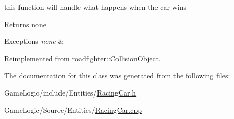 this function will handle what happens when the car wins \begin{DoxyReturn}{Returns}
none 
\end{DoxyReturn}

\begin{DoxyExceptions}{Exceptions}
{\em none} & \\
\hline
\end{DoxyExceptions}


Reimplemented from \hyperlink{classroadfighter_1_1CollisionObject_aa793e1b9943ee90bbb4129ddd06b9be7}{roadfighter\+::\+Collision\+Object}.



The documentation for this class was generated from the following files\+:\begin{DoxyCompactItemize}
\item 
Game\+Logic/include/\+Entities/\hyperlink{RacingCar_8h}{Racing\+Car.\+h}\item 
Game\+Logic/\+Source/\+Entities/\hyperlink{RacingCar_8cpp}{Racing\+Car.\+cpp}\end{DoxyCompactItemize}
